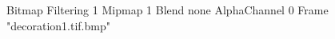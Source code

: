 {Bitmap
	{Filtering 1}
	{Mipmap 1}
	{Blend none}
	{AlphaChannel 0}
	{Frame "decoration1.tif.bmp"}
}
